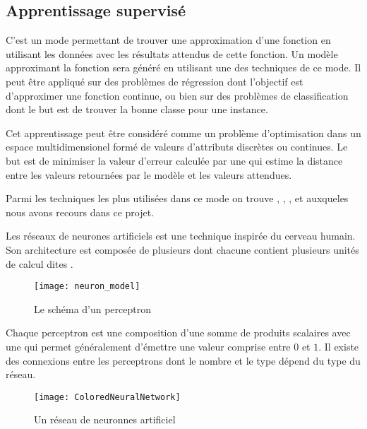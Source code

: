 \subsection{Apprentissage supervisé}

C'est un mode permettant de trouver une approximation d'une fonction en utilisant
les données avec les résultats attendus de cette fonction. Un modèle approximant
la fonction sera généré en utilisant une des techniques de ce mode.
Il peut être appliqué sur des problèmes de régression dont l'objectif est
d'approximer une fonction continue, ou bien sur des problèmes de classification
dont le but est de trouver la bonne classe pour une instance.

Cet apprentissage peut être considéré comme un problème d'optimisation
dans un espace multidimensionel formé de valeurs d'attributs discrètes ou
continues. Le but est de minimiser la valeur d'erreur calculée par une
 qui estime la distance entre les valeurs retournées
par le modèle et les valeurs attendues.

Parmi les techniques les plus utilisées dans ce mode on trouve
, ,
,
 et
 auxqueles nous avons recours dans
ce projet.

Les réseaux de neurones artificiels est une technique inspirée du cerveau humain.
Son architecture est composée de plusieurs  dont chacune
contient plusieurs unités de calcul dites .

\begin{figure}[h]
\begin{center}
\texttt{[image: neuron\_model]}
\caption{Le schéma d'un perceptron}{\cite{karpathy2016cs231n}}
\end{center}
\end{figure}

Chaque perceptron est une composition d'une somme de
produits scalaires avec une  qui permet
généralement d'émettre une valeur comprise entre $0$ et $1$.
Il existe des connexions entre les perceptrons dont le nombre et le type dépend
du type du réseau.

\begin{figure}[h]
\begin{center}
\texttt{[image: ColoredNeuralNetwork]}
\caption{Un réseau de neuronnes artificiel}{\cite{commonsANN}}
\end{center}
\end{figure}

